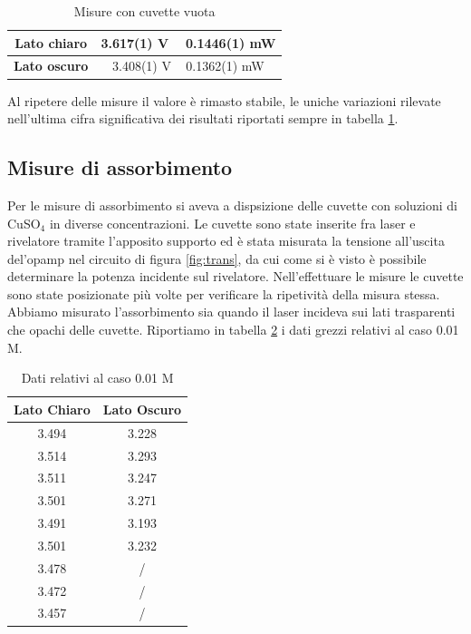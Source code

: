 \documentclass[a4paper]{article}
\begin{document}
\begin{table}[htp]
\centering
\caption{Misure con cuvette vuota}
\label{tab:empty}
\begin{tabular}{c|c}
\textbf{Lato chiaro} & 3.617(1) V ~ 0.1446(1) mW \\ 
\hline 
\textbf{Lato oscuro} & 3.408(1) V ~ 0.1362(1) mW \\ 
\end{tabular} 
\end{table}

Al ripetere delle misure il valore è rimasto stabile, le uniche variazioni rilevate nell'ultima cifra significativa dei risultati riportati sempre in tabella \ref{tab:empty}.

\subsection{Misure di assorbimento}

Per le misure di assorbimento si aveva a dispsizione delle cuvette con soluzioni di CuSO$_4$ in diverse concentrazioni. Le cuvette sono state inserite fra laser e rivelatore tramite l'apposito supporto ed è stata misurata la tensione all'uscita del'opamp nel circuito di figura \ref{fig:trans}, da cui come si è visto è possibile determinare la potenza incidente sul rivelatore. Nell'effettuare le misure le cuvette sono state posizionate più volte per verificare la ripetività della misura stessa. Abbiamo misurato l'assorbimento sia quando il laser incideva sui lati trasparenti che opachi delle cuvette. Riportiamo in tabella \ref{tab:001} i dati grezzi relativi al caso 0.01 M.

\begin{table}[htp]
\centering
\caption{Dati relativi al caso 0.01 M}
\label{tab:001}
\begin{tabular}{c|c}
\textbf{Lato Chiaro} &\textbf{ Lato Oscuro} \\ 
\hline 
3.494 & 3.228 \\ 
\hline 
3.514 & 3.293 \\ 
\hline 
3.511 & 3.247 \\ 
\hline 
3.501 & 3.271 \\ 
\hline 
3.491 & 3.193 \\ 
\hline 
3.501 & 3.232 \\ 
\hline 
3.478 & / \\		 
\hline 
3.472 & / \\	 
\hline 
3.457 & / \\ 
\end{tabular} 
\end{table}
\end{document}
